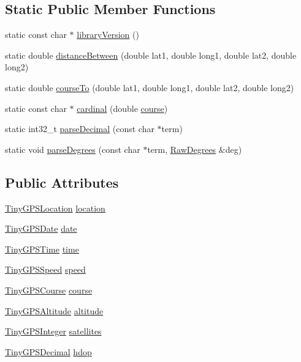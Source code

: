 \subsection*{Static Public Member Functions}
\begin{DoxyCompactItemize}
\item 
static const char $\ast$ \hyperlink{class_tiny_g_p_s_plus_a1ec39648e1c80c59f4fded642fdb88ae}{library\+Version} ()
\item 
static double \hyperlink{class_tiny_g_p_s_plus_ace607cf3a6d49628e44eae1232237138}{distance\+Between} (double lat1, double long1, double lat2, double long2)
\item 
static double \hyperlink{class_tiny_g_p_s_plus_af338c18ccf58a47659be1ffc8259541d}{course\+To} (double lat1, double long1, double lat2, double long2)
\item 
static const char $\ast$ \hyperlink{class_tiny_g_p_s_plus_a8c9e9444552ff85a505ffc6933dda03c}{cardinal} (double \hyperlink{class_tiny_g_p_s_plus_ad7800d3decbe58e355f5229bba231868}{course})
\item 
static int32\+\_\+t \hyperlink{class_tiny_g_p_s_plus_a06d9bf0c1f0d0963511dc05e2f121121}{parse\+Decimal} (const char $\ast$term)
\item 
static void \hyperlink{class_tiny_g_p_s_plus_a00627eaffc625bf366e4c984014fbf29}{parse\+Degrees} (const char $\ast$term, \hyperlink{struct_raw_degrees}{Raw\+Degrees} \&deg)
\end{DoxyCompactItemize}
\subsection*{Public Attributes}
\begin{DoxyCompactItemize}
\item 
\hyperlink{struct_tiny_g_p_s_location}{Tiny\+G\+P\+S\+Location} \hyperlink{class_tiny_g_p_s_plus_a886255f412f8e01f84e5104d36315fb3}{location}
\item 
\hyperlink{struct_tiny_g_p_s_date}{Tiny\+G\+P\+S\+Date} \hyperlink{class_tiny_g_p_s_plus_a83a70812b432d7f51c7c735bfe7be0f0}{date}
\item 
\hyperlink{struct_tiny_g_p_s_time}{Tiny\+G\+P\+S\+Time} \hyperlink{class_tiny_g_p_s_plus_a377c975527fa24b45fb86356505eb134}{time}
\item 
\hyperlink{struct_tiny_g_p_s_speed}{Tiny\+G\+P\+S\+Speed} \hyperlink{class_tiny_g_p_s_plus_aa085c3e72a399a829dd92af52b373404}{speed}
\item 
\hyperlink{struct_tiny_g_p_s_course}{Tiny\+G\+P\+S\+Course} \hyperlink{class_tiny_g_p_s_plus_ad7800d3decbe58e355f5229bba231868}{course}
\item 
\hyperlink{struct_tiny_g_p_s_altitude}{Tiny\+G\+P\+S\+Altitude} \hyperlink{class_tiny_g_p_s_plus_a0b3451a4ee75e5880ffd88c3038eacf8}{altitude}
\item 
\hyperlink{struct_tiny_g_p_s_integer}{Tiny\+G\+P\+S\+Integer} \hyperlink{class_tiny_g_p_s_plus_a5fb47066d1d03f4bb5853529053aab48}{satellites}
\item 
\hyperlink{struct_tiny_g_p_s_decimal}{Tiny\+G\+P\+S\+Decimal} \hyperlink{class_tiny_g_p_s_plus_a3a21b3ae7085bb278b35d703bf135632}{hdop}
\end{DoxyCompactItemize}
